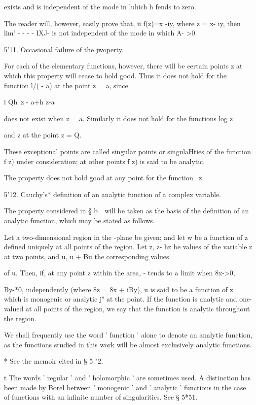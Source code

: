 exists and is independent of the mode in luhich h fends to zero.

The reader will, however, easily prove that, ii f(z)=x -iy, where z =
x- iy, then lim' - - - - IXJ- is not independent of the mode in which
A- >0.

5'11. Occasional failure of the jwoperty.

For each of the elementary functions, however, there will be certain
points z at which this property will cease to hold good. Thus it does
not hold for the function l/( - a) at the point z = a, since

 i Qh\ z - a+h z-a

does not exist when z = a. Similarly it does not hold for the
functions log z

and z at the point z = Q.

These exceptional points are called singular points or singulaHties of
the function f z) under consideration; at other points f z) is said
to be analytic.

The property does not hold good at any point for the function \ z.

5'12. Cauchy's* definition of an analytic function of a complex
variable.

The property considered in § b\ \ will be taken as the basis of the
definition of an analytic function, which may be stated as follows.

Let a two-dimensional region in the -plane be given; and let w be a
function of z defined uniquely at all points of the region. Let z, z-
hz be values of the variable z at two points, and u, u + Bu the
corresponding values

of u. Then, if, at any point z within the area, - tends to a limit
when 8x->0,

By-*0, independently (where 8z = 8x + iBy), u is said to be a function
of z which is monogenic or analytic j" at the point. If the function
is analytic and one-valued at all points of the region, we say that
the function is analytic throughout the region.

We shall frequently use the word ' function ' alone to denote an
analytic function, as the functions studied in this work will be
almost exclusively analytic functions.

* See the memoir cited in § 5 "2.

t The words ' regular ' and ' holomorphic ' are sometimes used. A
distinctiou has been made by Borel between ' monogenic ' and '
analytic ' functions in the case of functions with an infinite number
of singularities. See § 5*51.

